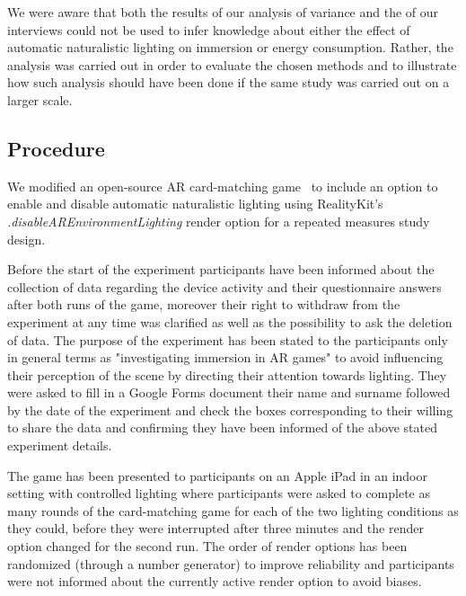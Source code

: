 \documentclass[12pt,twoside,english]{article}
\begin{document}
We were aware that both the results of our analysis of variance and the of our interviews could not be used to infer knowledge about either the effect of automatic naturalistic lighting on immersion or energy consumption.
Rather, the analysis was carried out in order to evaluate the chosen methods and to illustrate how such analysis should have been done if the same study was carried out on a larger scale.

\subsection{Procedure}
\label{sect:procedure}

We modified an open-source \gls{AR} card-matching game~\cite{cobb_maxxfrazerrealitykit-cardflip_2020} to include an option to enable and disable automatic naturalistic lighting using RealityKit's \textit{.disableAREnvironmentLighting} render option for a repeated measures study design.

Before the start of the experiment participants have been informed about the collection of data regarding the device activity and their questionnaire answers after both runs of the game, moreover their right to withdraw from the experiment at any time was clarified as well as the possibility to ask the deletion of data. The purpose of the experiment has been stated to the participants only in general terms as "investigating immersion in \gls{AR} games" to avoid influencing their perception of the scene by directing their attention towards lighting. 
They were asked to fill in a Google Forms document their name and surname followed by the date of the experiment and check the boxes corresponding to their willing to share the data and confirming they have been informed of the above stated experiment details.

The game has been presented to participants on an Apple iPad in an indoor setting with controlled lighting where participants were asked to complete as many rounds of the card-matching game for each of the two lighting conditions as they could, before they were interrupted after three minutes and the render option changed for the second run.
The order of render options has been randomized (through a number generator) to improve reliability and participants were not informed about the currently active render option to avoid biases.
\end{document}
